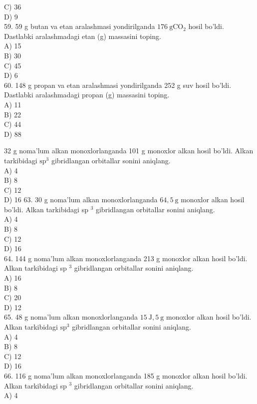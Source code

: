 C) 36\\
D) 9\\
59. 59 g butan va etan aralashmasi yondirilganda $176 \mathrm{~g} \mathrm{CO}_{2}$ hosil bo'ldi. Dastlabki aralashmadagi etan (g) massasini toping.\\
A) 15\\
B) 30\\
C) 45\\
D) 6\\
60. 148 g propan va etan aralashmasi yondirilganda 252 g suv hosil bo'ldi. Dastlabki aralashmadagi propan (g) massasini toping.\\
A) 11\\
B) 22\\
C) 44\\
D) 88
  \item 32 g noma'lum alkan monoxlorlanganda 101 g monoxlor alkan hosil bo'ldi. Alkan tarkibidagi $\mathrm{sp}^{3}$ gibridlangan orbitallar sonini aniqlang.\\
A) 4\\
B) 8\\
C) 12\\
D) 16
63. 30 g noma'lum alkan monoxlorlanganda $64,5 \mathrm{~g}$ monoxlor alkan hosil bo'ldi. Alkan tarkibidagi sp ${ }^{3}$ gibridlangan orbitallar sonini aniqlang.\\
A) 4\\
B) 8\\
C) 12\\
D) 16\\
64. 144 g noma'lum alkan monoxlorlanganda 213 g monoxlor alkan hosil bo'ldi. Alkan tarkibidagi sp ${ }^{3}$ gibridlangan orbitallar sonini aniqlang.\\
A) 16\\
B) 8\\
C) 20\\
D) 12\\
65. 48 g noma'lum alkan monoxlorlanganda $15 \mathrm{~J}, 5 \mathrm{~g}$ monoxlor alkan hosil bo'ldi. Alkan tarkibidagi $\mathrm{sp}^{3}$ gibridlangan orbitallar sonini aniqlang.\\
A) 4\\
B) 8\\
C) 12\\
D) 16\\
66. 116 g noma'lum alkan monoxlorlanganda 185 g monoxlor alkan hosil bo'ldi. Alkan tarkibidagi sp ${ }^{3}$ gibridlangan orbitallar sonini aniqlang.\\
A) 4\\
